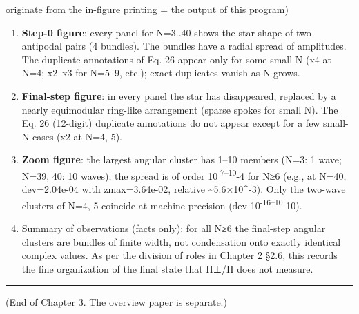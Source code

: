 \documentclass[
  a4paper,
]{ltjsarticle}
\providecommand{\tightlist}{%
  \setlength{\itemsep}{0pt}\setlength{\parskip}{0pt}}
\begin{document}
originate from the in-figure printing = the output of this program)

\begin{enumerate}
\def\labelenumi{\arabic{enumi}.}
\tightlist
\item
  \textbf{Step-0 figure}: every panel for N=3..40 shows the star shape
  of two antipodal pairs (4 bundles). The bundles have a radial spread
  of amplitudes. The duplicate annotations of Eq. 26 appear only for
  some small N (x4 at N=4; x2--x3 for N=5--9, etc.); exact duplicates
  vanish as N grows.
\item
  \textbf{Final-step figure}: in every panel the star has disappeared,
  replaced by a nearly equimodular ring-like arrangement (sparse spokes
  for small N). The Eq. 26 (12-digit) duplicate annotations do not
  appear except for a few small-N cases (x2 at N=4, 5).
\item
  \textbf{Zoom figure}: the largest angular cluster has 1--10 members
  (N=3: 1 wave; N=39, 40: 10 waves); the spread is of order
  10\textsuperscript{-7--10}-4 for N≥6 (e.g., at N=40, dev=2.04e-04 with
  \textbar z\textbar max=3.64e-02, relative
  \textasciitilde5.6×10\^{}-3). Only the two-wave clusters of N=4, 5
  coincide at machine precision (dev 10\textsuperscript{-16--10}-10).
\item
  Summary of observations (facts only): for all N≥6 the final-step
  angular clusters are bundles of finite width, not condensation onto
  exactly identical complex values. As per the division of roles in
  Chapter 2 §2.6, this records the fine organization of the final state
  that H⊥/H does not measure.
\end{enumerate}

\begin{center}\rule{0.5\linewidth}{0.5pt}\end{center}

(End of Chapter 3. The overview paper is separate.)
\end{document}
